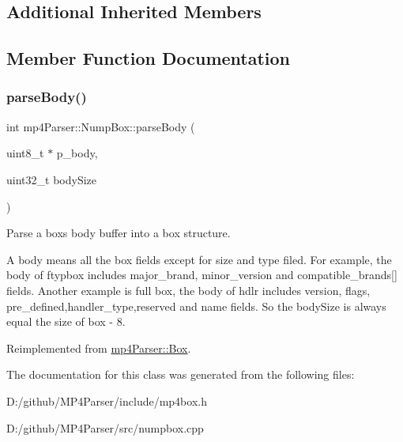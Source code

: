 \subsection*{Additional Inherited Members}


\subsection{Member Function Documentation}
\mbox{\label{classmp4_parser_1_1_nump_box_abbbb17a66d56147ad973631118f0a0ed}} 
\subsubsection{\texorpdfstring{parseBody()}{parseBody()}}
{\footnotesize\ttfamily int mp4\+Parser\+::\+Nump\+Box\+::parse\+Body (\begin{DoxyParamCaption}\item[{uint8\+\_\+t $\ast$}]{p\+\_\+body,  }\item[{uint32\+\_\+t}]{body\+Size }\end{DoxyParamCaption})\hspace{0.3cm}{\ttfamily [virtual]}}



Parse a box\textquotesingle{}s body buffer into a box structure. 

A body means all the box fields except for size and type filed. For example, the body of ftypbox includes major\+\_\+brand, minor\+\_\+version and compatible\+\_\+brands\mbox{[}\mbox{]} fields. Another example is full box, the body of hdlr includes version, flags, pre\+\_\+defined,handler\+\_\+type,reserved and name fields. So the body\+Size is always equal the size of box -\/ 8. 

Reimplemented from \mbox{\hyperlink{classmp4_parser_1_1_box_a3dd0c084ac65bc77b69ac5ecaf796cb2}{mp4\+Parser\+::\+Box}}.



The documentation for this class was generated from the following files\+:\begin{DoxyCompactItemize}
\item 
D\+:/github/\+M\+P4\+Parser/include/mp4box.\+h\item 
D\+:/github/\+M\+P4\+Parser/src/numpbox.\+cpp\end{DoxyCompactItemize}
